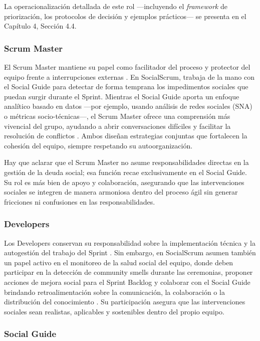 La operacionalización detallada de este rol —incluyendo el \textit{framework} de priorización, los protocolos de decisión y ejemplos prácticos— se presenta en el Capítulo 4, Sección 4.4.

\subsubsection{Scrum Master}

El Scrum Master mantiene su papel como facilitador del proceso y protector del equipo frente a interrupciones externas \cite{schwaber2020scrum}. En SocialScrum, trabaja de la mano con el Social Guide para detectar de forma temprana los impedimentos sociales que puedan surgir durante el Sprint. Mientras el Social Guide aporta un enfoque analítico basado en datos —por ejemplo, usando análisis de redes sociales (SNA) o métricas socio-técnicas—, el Scrum Master ofrece una comprensión más vivencial del grupo, ayudando a abrir conversaciones difíciles y facilitar la resolución de conflictos \cite{saeeda2024nontechnicaldebt}. Ambos diseñan estrategias conjuntas que fortalecen la cohesión del equipo, siempre respetando su autoorganización.

Hay que aclarar que el Scrum Master no asume responsabilidades directas en la gestión de la deuda social; esa función recae exclusivamente en el Social Guide. Su rol es más bien de apoyo y colaboración, asegurando que las intervenciones sociales se integren de manera armoniosa dentro del proceso ágil sin generar fricciones ni confusiones en las responsabilidades.

\subsubsection{Developers}

Los Developers conservan su responsabilidad sobre la implementación técnica y la autogestión del trabajo del Sprint \cite{schwaber2020scrum}. Sin embargo, en SocialScrum asumen también un papel activo en el monitoreo de la salud social del equipo, donde deben participar en la detección de community smells durante las ceremonias, proponer acciones de mejora social para el Sprint Backlog y colaborar con el Social Guide brindando retroalimentación sobre la comunicación, la colaboración o la distribución del conocimiento \cite{saeeda2024nontechnicaldebt}. Su participación asegura que las intervenciones sociales sean realistas, aplicables y sostenibles dentro del propio equipo.

\subsubsection{Social Guide}

